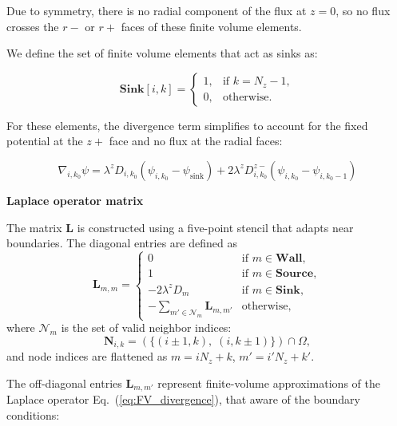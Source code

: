 \documentclass[10pt, a4paper]{article}
\begin{document}
\begin{multicols}{2}
Due to symmetry, there is no radial component of the flux at $z = 0$, so no flux crosses the $r-$ or $r+$ faces of these finite volume elements.

We define the set of finite volume elements that act as sinks as:

\begin{equation}
    \textbf{Sink}[i,k] =
    \begin{cases}
    1, & \text{if } k = N_z - 1, \\
    0, & \text{otherwise}.
    \end{cases}
\end{equation}

For these elements, the divergence term simplifies to account for the fixed potential at the $z+$ face and no flux at the radial faces:

\begin{equation}
\nabla_{i,k_0} \psi =
\lambda^{z} D_{i,k_0} (\psi_{i,k_0} - \psi_{\text{sink}})
+ 2 \lambda^{z} D_{i,k_0}^{z-} (\psi_{i,k_0} - \psi_{i,k_0-1})
\end{equation}


\textbf{Laplace operator matrix}

The matrix $\mathbf{L}$ is constructed using a five-point stencil that adapts near boundaries.
The diagonal entries are defined as
\begin{equation}
  \bm{L}_{m,m} = 
  \begin{cases}
    0 & \text{if } m \in \textbf{Wall}, \\
    1 & \text{if } m \in \textbf{Source}, \\
    - 2 \lambda^{z} D_m & \text{if } m \in \textbf{Sink}, \\
    -\!\!\!\sum\limits_{m' \in \mathcal{N}_m} \bm{L}_{m, m'} & \text{otherwise},
  \end{cases}
  \label{eq:L_diag}
\end{equation}
where $\mathcal{N}_m$ is the set of valid neighbor indices:
\begin{equation}
  \textbf{N}_{i,k} = \left( \{(i \pm 1, k),\; (i, k \pm 1)\} \right) \cap \Omega,
  \label{eq:neighbors}
\end{equation}
and node indices are flattened as $m = i N_z + k$, $m' = i' N_z + k'$.

The off-diagonal entries $\bm{L}_{m,m'}$ represent finite-volume approximations of the Laplace operator Eq.~(\ref{eq:FV_divergence}), that aware of the boundary conditions:


\end{multicols}
\end{document}
